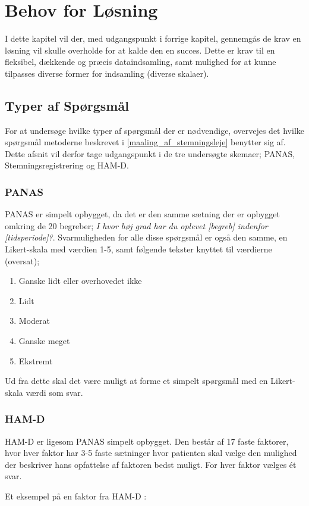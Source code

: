 \chapter{Behov for Løsning}
I dette kapitel vil der, med udgangspunkt i forrige kapitel, gennemgås de krav en løsning vil skulle overholde for at kalde den en succes.
Dette er krav til en fleksibel, dækkende og præcis dataindsamling, samt mulighed for at kunne tilpasses diverse former for indsamling (diverse skalaer).

\section{Typer af Spørgsmål}
For at undersøge hvilke typer af spørgsmål der er nødvendige, overvejes det hvilke spørgsmål metoderne beskrevet i \cref{maaling_af_stemningsleje} benytter sig af.
Dette afsnit vil derfor tage udgangspunkt i de tre undersøgte skemaer; PANAS, Stemningsregistrering og HAM-D.

\subsection{PANAS} 
PANAS er simpelt opbygget, da det er den samme sætning der er opbygget omkring de 20 begreber; \textit{I hvor høj grad har du oplevet [begreb] indenfor [tidsperiode]?}.
Svarmuligheden for alle disse spørgsmål er også den samme, en Likert-skala\cite{likert} med værdien 1-5, samt følgende tekster knyttet til værdierne (oversat);
\begin{enumerate}
\item Ganske lidt eller overhovedet ikke
\item Lidt
\item Moderat
\item Ganske meget
\item Ekstremt
\end{enumerate}

Ud fra dette skal det være muligt at forme et simpelt spørgsmål med en Likert-skala værdi som svar.

\subsection{HAM-D} 
HAM-D er ligesom PANAS simpelt opbygget.
Den består af 17 faste faktorer, hvor hver faktor har 3-5 faste sætninger hvor patienten skal vælge den mulighed der beskriver hans opfattelse af faktoren bedst muligt.
For hver faktor vælges ét svar.

Et eksempel på en faktor fra HAM-D \cite{ham_d}:\\

